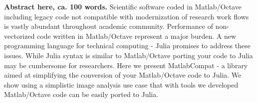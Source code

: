 \textbf{Abstract here, ca. 100 words.}
Scientific software coded in Matlab/Octave including legacy code not compatible with modernization of research work flows is vastly abundant throughout academic community. Performance of non-vectorized code written in Matlab/Octave represent a major burden. A new programming language for technical computing - Julia promises to address these issues. While Julia syntax is similar to Matlab/Octave porting your code to Julia may be cumbersome for researchers. Here we present MatlabCompat - a library aimed at simplifying the conversion of your Matlab/Octave code to Julia. We show using a simplistic image analysis use case that with tools we developed Matlab/Octave code can be easily ported to Julia.